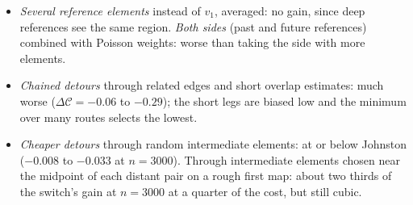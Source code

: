 \documentclass[prd,twocolumn,superscriptaddress,nofootinbib,amsmath,amssymb,floatfix]{revtex4-2}
\begin{document}
\begin{itemize}
\item \emph{Several reference elements} instead of $v_1$, averaged: no gain, since deep references see the same region. \emph{Both sides} (past and future references) combined with Poisson weights: worse than taking the side with more elements.
\item \emph{Chained detours} through related edges and short overlap estimates: much worse ($\Delta\mathcal C=-0.06$ to $-0.29$); the short legs are biased low and the minimum over many routes selects the lowest.
\item \emph{Cheaper detours} through random intermediate elements: at or below Johnston ($-0.008$ to $-0.033$ at $n=3000$). Through intermediate elements chosen near the midpoint of each distant pair on a rough first map: about two thirds of the switch's gain at $n=3000$ at a quarter of the cost, but still cubic.
\end{itemize}
\end{document}
